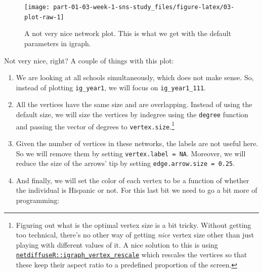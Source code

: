 \documentclass[]{book}
\newenvironment{Shaded}{\begin{snugshade}}{\end{snugshade}}
\newcommand{\DecValTok}[1]{\textcolor[rgb]{0.00,0.00,0.81}{#1}}
\newcommand{\KeywordTok}[1]{\textcolor[rgb]{0.13,0.29,0.53}{\textbf{#1}}}
\newcommand{\NormalTok}[1]{#1}
\newcommand{\OperatorTok}[1]{\textcolor[rgb]{0.81,0.36,0.00}{\textbf{#1}}}
\newcommand{\StringTok}[1]{\textcolor[rgb]{0.31,0.60,0.02}{#1}}
\begin{document}
\begin{figure}

{\centering \texttt{[image: part-01-03-week-1-sns-study\_files/figure-latex/03-plot-raw-1]} 

}

\caption{A not very nice network plot. This is what we get with the default parameters in igraph.}\label{fig:03-plot-raw}
\end{figure}

Not very nice, right? A couple of things with this plot:

\begin{enumerate}
\def\labelenumi{\arabic{enumi}.}
\item
  We are looking at all schools simultaneously, which does not make sense. So, instead of plotting \texttt{ig\_year1}, we will focus on \texttt{ig\_year1\_111}.
\item
  All the vertices have the same size and are overlapping. Instead of using the default size, we will size the vertices by indegree using the \texttt{degree} function and passing the vector of degrees to \texttt{vertex.size}.\footnote{Figuring out what is the optimal vertex size is a bit tricky. Without getting too technical, there's no other way of getting \emph{nice} vertex size other than just playing with different values of it. A nice solution to this is using \href{https://www.rdocumentation.org/packages/netdiffuseR/versions/1.17.0/topics/rescale_vertex_igraph}{\texttt{netdiffuseR::igraph\_vertex\_rescale}} which rescales the vertices so that these keep their aspect ratio to a predefined proportion of the screen.}
\item
  Given the number of vertices in these networks, the labels are not useful here. So we will remove them by setting \texttt{vertex.label\ =\ NA}. Moreover, we will reduce the size of the arrows' tip by setting \texttt{edge.arrow.size\ =\ 0.25}.
\item
  And finally, we will set the color of each vertex to be a function of whether the individual is Hispanic or not. For this last bit we need to go a bit more of programming:
\end{enumerate}

\begin{Shaded}
\end{Shaded}
\end{document}
